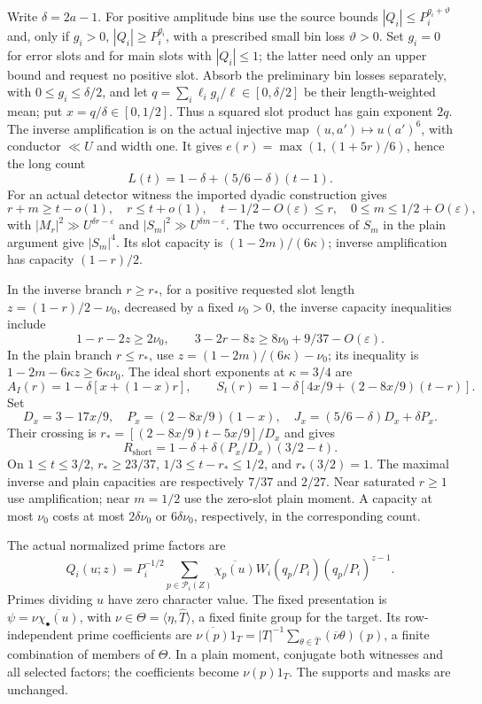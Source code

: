 \documentclass[11pt,a4paper]{article}
\theoremstyle{definition}
\newcommand{\eps}{\varepsilon}
\begin{document}
Write $\delta=2a-1$. For positive amplitude bins use the source bounds
$|Q_i|\le P_i^{g_i+\vartheta}$ and, only if $g_i>0$,
$|Q_i|\ge P_i^{g_i}$, with a prescribed small bin loss
$\vartheta>0$.
Set $g_i=0$ for error slots and for main slots with $|Q_i|\le1$;
the latter need only an upper bound and request no positive slot.
Absorb the preliminary bin losses separately, with
$0\le g_i\le\delta/2$, and let
$q=\sum_i\ell_i g_i/\ell\in[0,\delta/2]$ be their length-weighted
mean; put $x=q/\delta\in[0,1/2]$.
Thus a squared slot product has gain exponent $2q$.
The inverse amplification is on the actual injective map
$(u,a')\mapsto u(a')^6$, with conductor $\ll U$ and width one.
It gives $e(r)=\max(1,(1+5r)/6)$, hence the long count
\begin{equation}\label{eq:longcount}
 L(t)=1-\delta+(5/6-\delta)(t-1).
\end{equation}
For an actual detector witness the imported dyadic construction gives
\[
 r+m\ge t-o(1),\quad r\le t+o(1),\quad
 t-1/2-O(\eps)\le r,\quad 0\le m\le1/2+O(\eps),
\]
with $|M_r|^2\gg U^{\delta r-\eps}$ and
$|S_m|^2\gg U^{\delta m-\eps}$.
The two occurrences of $S_m$ in the plain argument give $|S_m|^4$.
Its slot capacity is $(1-2m)/(6\kappa)$; inverse amplification
has capacity $(1-r)/2$.

In the inverse branch $r\ge r_*$, for a positive requested slot
length $z=(1-r)/2-\nu_0$, decreased by a fixed $\nu_0>0$,
the inverse capacity inequalities include
\[
 1-r-2z\ge2\nu_0,\qquad
 3-2r-8z\ge8\nu_0+9/37-O(\eps).
\]
In the plain branch $r\le r_*$, use
$z=(1-2m)/(6\kappa)-\nu_0$; its inequality is
$1-2m-6\kappa z\ge6\kappa\nu_0$.
The ideal short exponents at $\kappa=3/4$ are
\[
 A_I(r)=1-\delta[x+(1-x)r],\qquad
 S_t(r)=1-\delta[4x/9+(2-8x/9)(t-r)].
\]
Set
\begin{equation}\label{eq:DP}
 D_x=3-17x/9,\quad P_x=(2-8x/9)(1-x),\quad
 J_x=(5/6-\delta)D_x+\delta P_x.
\end{equation}
Their crossing is
$r_*=[(2-8x/9)t-5x/9]/D_x$ and gives
\[
 R_{\mathrm{short}}=1-\delta+
          \delta(P_x/D_x)(3/2-t).
\]
On $1\le t\le3/2$, $r_*\ge23/37$,
$1/3\le t-r_*\le1/2$, and $r_*(3/2)=1$.
The maximal inverse and plain capacities are respectively
$7/37$ and $2/27$. Near saturated $r\ge1$ use amplification;
near $m=1/2$ use the zero-slot plain moment. A capacity at most
$\nu_0$ costs at most $2\delta\nu_0$ or $6\delta\nu_0$,
respectively, in the corresponding count.

The actual normalized prime factors are
\begin{equation}\label{eq:Qi}
 Q_i(u;z)=P_i^{-1/2}
  \sum_{p\in\mathcal P_i(Z)}
  \overline{\chi_p(u)}W_i(q_p/P_i)(q_p/P_i)^{z-1}.
\end{equation}
Primes dividing $u$ have zero character value. The fixed presentation
is $\psi=\nu\overline{\chi_\bullet(u)}$, with
$\nu\in\Theta=\langle\eta,\widehat T\rangle$, a fixed finite group
for the target. Its row-independent prime coefficients are
$\overline{\nu(p)}1_T=|T|^{-1}\sum_{\theta\in\widehat T}
(\overline{\nu}\theta)(p)$, a finite combination of members of $\Theta$.
In a plain moment, conjugate both witnesses
and all selected factors; the coefficients become $\nu(p)1_T$.
The supports and masks are unchanged.
\end{document}
